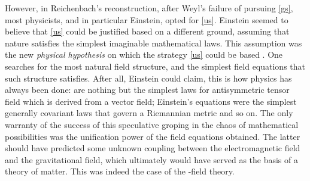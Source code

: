 \documentclass[draft]{article}
\newcommand{\FP}{\german{Fernparallelismus}\xspace}
\begin{document}
However, in Reichenbach's reconstruction, after Weyl's failure of pursuing \cref{gs}, most physicists, and in particular Einstein, opted for \cref{us}. Einstein seemed to believe that \cref{us} could be justified based on a different ground, assuming that nature satisfies the simplest imaginable mathematical laws. This assumption was the new \emph{physical hypothesis} on which the strategy \cref{us} could be based \citep[see][\S50]{Reichenbach1928}. One searches for the most natural field structure, and the simplest field equations that such structure satisfies. After all, Einstein could claim, this is how physics has always been done: \ME are nothing but the simplest laws for antisymmetric tensor field \Fmn which is derived from a vector field; Einstein's equations were the simplest generally covariant laws that govern a Riemannian metric \gmn and so on. The only warranty of the success of this speculative groping in the chaos of mathematical possibilities was the unification power of the field equations obtained. The latter should have predicted some unknown coupling between the electromagnetic field and the gravitational field, which ultimately would have served as the basis of a theory of matter. This was indeed the case of the \FP-field theory. 
\end{document}
